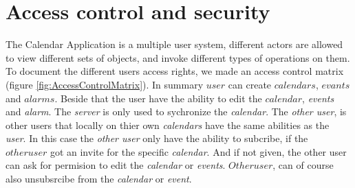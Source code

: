 \section{Access control and security}

The Calendar Application is a multiple user system, different actors are allowed to view different sets of objects, and invoke different types of operations on them. To document the different users access rights, we made an access control matrix (figure \ref{fig:AccessControlMatrix}). 
In summary \(user\) can create \(calendars\), \(evants\) and \(alarms\). Beside that the user have the ability to edit the \(calendar\), \textit{events} and \textit{alarm}. The \textit{server} is only used to sychronize the \textit{calendar}. The \textit{other user}, is other users that locally on thier own \textit{calendars} have the same abilities as the \textit{user}. In this case the \textit{other user} only have the ability to subcribe, if the \(other user\) got an invite for the specific \textit{calendar}. And if not given, the other user can ask for permision to edit the \textit{calendar} or \textit{events}. \(Other user\), can of course also unsubsrcibe from the \textit{calendar} or \textit{event}.
\newline

